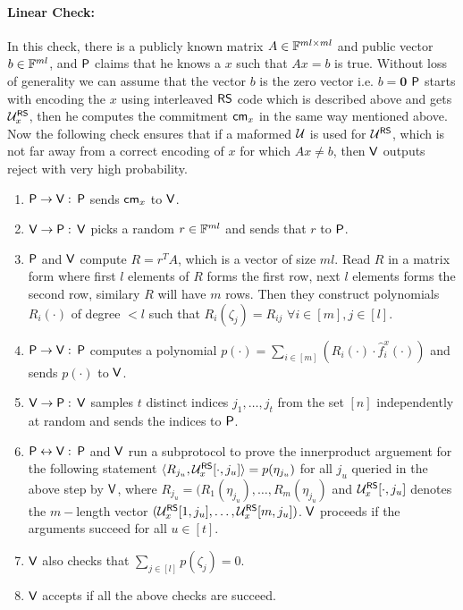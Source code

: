 \paragraph{\textbf{Linear Check:}}\label{sec: linearity} In this check, there is a publicly known matrix $A \in \mathbb{F}^{ml\times ml}$ and public vector $b\in \mathbb{F}^{ml}$, and $\mathsf{P}$ claims that he knows a $x$ such that $Ax=b$ is true. Without loss of generality we can assume that the vector $b$ is the zero vector i.e. $b=\bm{0}$ $\mathsf{P}$ starts with encoding the $x$ using interleaved $\mathsf{RS}$ code which is described above and gets $\mathcal{U}^{\mathsf{RS}}_x$, then he computes the commitment $\mathsf{cm}_x$ in the same way mentioned above. Now the following check ensures that if a maformed $\mathcal{U}$ is used for $\mathcal{U}^{\mathsf{RS}}$, which is not far away from a correct encoding of $x$ for which $Ax\neq b$, then $\mathsf{V}$ outputs reject with very high probability.
\begin{enumerate}
	\item $\mathsf{P} \rightarrow \mathsf{V}: $ $\mathsf{P}$ sends $\mathsf{cm}_x$ to $\mathsf{V}$.
	\item $\mathsf{V} \rightarrow \mathsf{P}: $ $\mathsf{V}$ picks a random $r\in \mathbb{F}^{ml}$ and sends that $r$ to $\mathsf{P}$.
	\item $\mathsf{P}$ and $\mathsf{V}$ compute $R=r^TA$, which is a vector of size $ml$. Read $R$ in a matrix form where first $l$ elements of $R$ forms the first row, next $l$ elements forms the second row, similary $R$ will have $m$ rows. Then they construct polynomials $R_i(\cdot)$ of degree $<l$ such that $R_i(\zeta_j)=R_{ij}$ $\forall i\in [m], j\in [l]$. 
	\item $\mathsf{P} \rightarrow \mathsf{V}: $  $\mathsf{P}$ computes a polynomial $p(\cdot)=\sum_{i\in[m]} ( R_i(\cdot)\cdot \hat{f}^x_i(\cdot))$ and sends $p(\cdot)$ to $\mathsf{V}$.
	\item $\mathsf{V} \rightarrow \mathsf{P}: $ $\mathsf{V}$ samples $t$ distinct  indices $j_1,\ldots,j_t$ from the set $[n]$ independently at random and sends the indices to $\mathsf{P}$.
	\item $\mathsf{P} \leftrightarrow \mathsf{V}: $ $\mathsf{P}$ and $\mathsf{V}$ run a subprotocol to prove the innerproduct arguement for the following statement $\langle R_{j_u},\mathcal{U}^{\mathsf{RS}}_x[\cdot,j_u]\rangle = p(\eta_{j_u})$ for all $j_u$ queried in the above step by $\mathsf{V}$, where $R_{j_u}=(R_1(\eta_{j_u}),\ldots,R_m(\eta_{j_u})$ and $\mathcal{U}^{\mathsf{RS}}_x[\cdot,j_u]$ denotes the $m-$length vector $(\mathcal{U}^{\mathsf{RS}}_x[1,j_u],\ldots, \mathcal{U}^{\mathsf{RS}}_x[m,j_u])$. $\mathsf{V}$ proceeds if the arguments succeed for all $u \in [t]$.
	\item $\mathsf{V}$ also checks that $\sum_{j\in[l]} p(\zeta_j)=0$.
	\item $\mathsf{V}$ accepts if all the above checks are succeed.	  
\end{enumerate}

